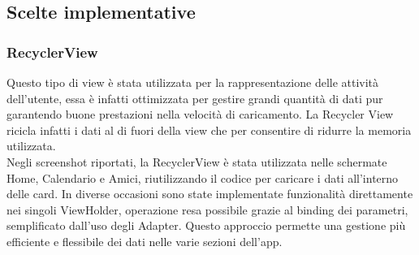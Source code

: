 \documentclass{article}
\begin{document}
    \newpage
    \subsection*{Scelte implementative}
    \subsubsection*{RecyclerView}
    Questo tipo di view è stata utilizzata per la rappresentazione delle attività dell'utente, essa è infatti ottimizzata per gestire grandi quantità di dati pur garantendo buone prestazioni nella velocità di caricamento. La Recycler View ricicla infatti i dati al di fuori della view che per consentire di ridurre la memoria utilizzata. \vspace*{7pt}\\
    Negli screenshot riportati, la RecyclerView è stata utilizzata nelle schermate Home, Calendario e Amici, riutilizzando il codice per caricare i dati all'interno delle card. In diverse occasioni sono state implementate funzionalità direttamente nei singoli ViewHolder, operazione resa possibile grazie al binding dei parametri, semplificato dall'uso degli Adapter. Questo approccio permette una gestione più efficiente e flessibile dei dati nelle varie sezioni dell'app.
\end{document}
